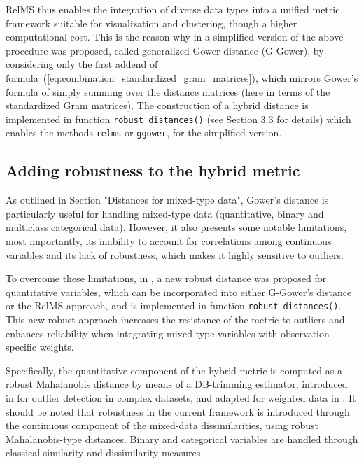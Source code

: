 RelMS thus enables the integration of diverse data types into a unified metric framework suitable for visualization and clustering, though a higher computational cost. This is the reason why in \cite{grane2021robust} a simplified version of the above procedure was proposed, called generalized Gower distance (G-Gower), by considering only the first addend of formula~(\ref{eq:combination_standardized_gram_matrices}), which mirrors Gower's formula of simply summing over the distance matrices (here in terms of the standardized Gram matrices).
The construction of a hybrid distance is implemented in function \texttt{robust\_distances()} (see Section 3.3 for details) which enables the methods \texttt{relms} or \texttt{ggower}, for the simplified version.

\subsection*{Adding robustness to the hybrid metric}

As outlined in Section "Distances for mixed-type data",
Gower's distance is particularly useful for handling mixed-type data (quantitative, binary and multiclass categorical data). However, it also presents some notable limitations, most importantly, its inability to account for correlations among continuous variables and its lack of robustness, which makes it highly sensitive to outliers.

To overcome these limitations, in \cite{boj2024robustification}, a new robust distance was proposed for quantitative variables, which can be incorporated into either G-Gower's distance or the RelMS approach, and is implemented in function \texttt{robust\_distances()}. This new robust approach increases the resistance of the metric to outliers and enhances reliability when integrating mixed-type variables with observation-specific weights.

Specifically, the quantitative component of the hybrid metric is computed as a robust Mahalanobis distance by means of a DB-trimming estimator, introduced in \cite{grane2021robust} for outlier detection in complex datasets, and adapted for weighted data in \cite{boj2024robustification}.
It should be noted that robustness in the current framework is introduced through the continuous component of the mixed-data dissimilarities, using robust Mahalanobis-type distances. Binary and categorical variables are handled through classical similarity and dissimilarity measures.

